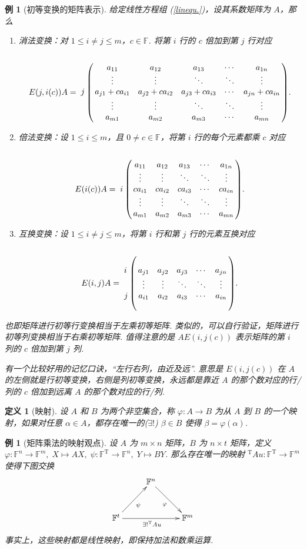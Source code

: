 \documentclass[10pt,openany]{article}
\theoremstyle{thmstyle} %
\theoremstyle{defstyle} %
\newtheorem{definition}[theorem]{定义}
\theoremstyle{prostyle} %
\theoremstyle{exastyle}
\newtheorem{example}[theorem]{例}
\theoremstyle{remstyle}
\newcommand{\T}{^{\text{T}}}
\newcommand{\F}{\mathbb{F}}
\begin{document}
\begin{example}[初等变换的矩阵表示]
	给定线性方程组 (\ref{linequ.})，设其系数矩阵为 \( A \)，那么
	\begin{enumerate}[(1)]
		\item 消法变换：对 \( 1 \leq i \neq j \leq m \)，\( c \in \F \). 将第 \( i \) 行的 \( c \) 倍加到第 \( j \) 行对应
		\[ E(j,i(c))A=\bordermatrix{
			&&&&& \cr
			&a_{11} & a_{12} & a_{13} & \cdots & a_{1n} \cr
			&\vdots & \vdots & \ddots & \ddots & \vdots \cr
			j &a_{j1}+ca_{i1} & a_{j2}+ca_{i2} & a_{j3}+ca_{i3} &  \cdots & a_{jn}+ca_{in} \cr
			&\vdots & \vdots & \ddots & \ddots & \vdots \cr
			&a_{m1} & a_{m2} & a_{m3} & \cdots & a_{mn}
		}. \]
		\item 倍法变换：设 \( 1 \leq i \leq m \)，且 \( 0 \neq c \in \F \)，将第 \( i \) 行的每个元素都乘 \( c \) 对应
		\[ E(i(c))A=\bordermatrix{
			&&&&& \cr
			&a_{11} & a_{12} & a_{13} & \cdots & a_{1n} \cr
			&\vdots & \vdots & \ddots & \ddots & \vdots \cr
			i &ca_{i1} & ca_{i2} & ca_{i3} &  \cdots & ca_{in} \cr
			&\vdots & \vdots & \ddots & \ddots & \vdots \cr
			&a_{m1} & a_{m2} & a_{m3} & \cdots & a_{mn}
		}.  \]
		\item 互换变换：设 \( 1 \leq i \neq j \leq m \)，将第 \( i \) 行和第 \( j \) 行的元素互换对应
		\[ E(i,j)A=\bordermatrix{
			&&&&& \cr
			&&&&& \cr
			i &a_{j1} & a_{j2} & a_{j3} &  \cdots & a_{jn} \cr
			&\vdots & \vdots & \ddots & \ddots & \vdots \cr
			j &a_{i1} & a_{i2} & a_{i3} &  \cdots & a_{in} \cr
			&&&&& 
		}.   \]
	\end{enumerate}
	
	也即矩阵进行初等行变换相当于左乘初等矩阵. 类似的，可以自行验证，矩阵进行初等列变换相当于右乘初等矩阵. 值得注意的是 \( AE(i,j(c)) \) 表示矩阵的第 \( i \) 列的 \( c \) 倍加到第 \( j \) 列. 
	
	有一个比较好用的记忆口诀，“左行右列，由近及远”. 意思是 \( E(i,j(c)) \) 在 \( A \) 的左侧就是行初等变换，右侧是列初等变换，永远都是靠近 \( A \) 的那个数对应的行/列的 \( c \) 倍加到远离 \( A \) 的那个数对应的行/列.
\end{example}

\begin{definition}[映射]
	设 \( A \) 和 \( B \) 为两个非空集合，称 \( \varphi:A \to B \) 为从 \( A \) 到 \( B \) 的一个映射，如果对任意 \( \alpha \in A \)，都存在唯一的(\( \exists !\)) \( \beta \in B \) 使得 \( \beta=\varphi(\alpha) \). 
\end{definition}


\begin{example}[矩阵乘法的映射观点]	\label{1.3.6}
	设 \( A \) 为 \( m \times n \) 矩阵，\( B \) 为 \( n \times t \) 矩阵，定义 \( \varphi: \F^n \to \F^m, \; X \mapsto AX, \; \psi: \F\T \to \F^n, \; Y \mapsto BY \). 那么存在唯一的映射 \( \T Au: \F\T \to \F^m \) 使得下图交换
	\[ \xymatrix@R=7ex@C=6ex{
		 & \F^n\ar"2,3"_{\varphi} & \\
		\F^t\ar"1,2"_{\psi}\ar"2,3"_{\exists ! \T Au} &  & \F^m\\
	} \]
	事实上，这些映射都是线性映射，即保持加法和数乘运算.

\end{example}
\end{document}
